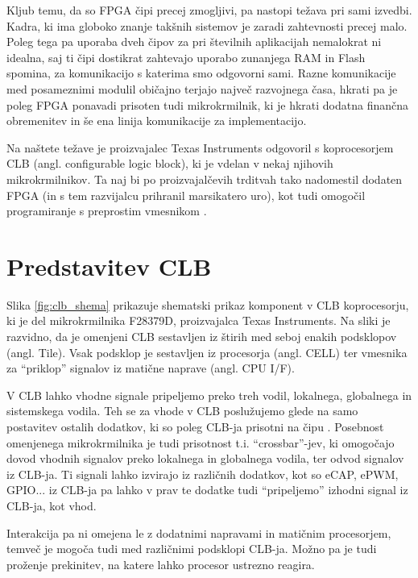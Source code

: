 \documentclass[a4paper]{article}
\begin{document}
\begin{sloppypar}
Kljub temu, da so FPGA čipi precej zmogljivi, pa nastopi težava pri sami
izvedbi. Kadra, ki ima globoko znanje takšnih sistemov je zaradi zahtevnosti
precej malo. Poleg tega pa uporaba dveh čipov za pri številnih aplikacijah
nemalokrat ni idealna, saj ti čipi dostikrat zahtevajo uporabo zunanjega RAM in
Flash spomina, za komunikacijo s katerima smo odgovorni sami. Razne
komunikacije med posameznimi modulil običajno terjajo največ razvojnega časa,
hkrati pa je poleg FPGA ponavadi prisoten tudi mikrokrmilnik, ki je hkrati
dodatna finančna obremenitev in še ena linija komunikacije za implementacijo.

Na naštete težave je proizvajalec Texas Instruments odgovoril s koprocesorjem
CLB (angl. configurable logic block), ki je vdelan v nekaj njihovih
mikrokrmilnikov. Ta naj bi po proizvajalčevih trditvah tako nadomestil dodaten
FPGA (in s tem razvijalcu prihranil marsikatero uro), kot tudi omogočil
programiranje s preprostim vmesnikom \cite{clb-intro}.



\section{Predstavitev CLB}\label{sec:predstavitev}
Slika \ref{fig:clb_shema} prikazuje shematski prikaz komponent v CLB
koprocesorju, ki je del mikrokrmilnika F28379D, proizvajalca Texas Instruments.
Na sliki je razvidno, da je omenjeni CLB sestavljen iz štirih med seboj enakih
podsklopov (angl. Tile). Vsak podsklop je sestavljen iz procesorja (angl. CELL)
ter vmesnika za ``priklop'' signalov iz matične naprave (angl. CPU I/F).

V CLB lahko vhodne signale pripeljemo preko treh vodil, lokalnega, globalnega
in sistemskega vodila. Teh se za vhode v CLB poslužujemo glede na samo
postavitev ostalih dodatkov, ki so poleg CLB-ja prisotni na čipu
\cite[Pogl.~26.3]{mcu-ref-manual}. Posebnost omenjenega mikrokrmilnika je tudi
prisotnost t.i. ``crossbar''-jev, ki omogočajo dovod vhodnih signalov preko
lokalnega in globalnega vodila, ter odvod signalov iz CLB-ja. Ti signali lahko
izvirajo iz različnih dodatkov, kot so eCAP, ePWM, GPIO... iz CLB-ja pa lahko v
prav te dodatke tudi ``pripeljemo'' izhodni signal iz CLB-ja, kot vhod.

Interakcija pa ni omejena le z dodatnimi napravami in matičnim procesorjem,
temveč je mogoča tudi med različnimi podsklopi CLB-ja. Možno pa je tudi
proženje prekinitev, na katere lahko procesor ustrezno reagira.


\end{sloppypar}
\end{document}
